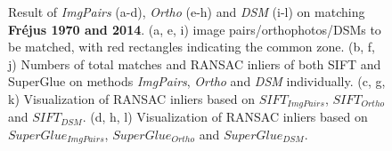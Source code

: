 \begin{figure}[htbp]
\begin{center}
{\begin{minipage}[t]{0.48\linewidth}
            \end{minipage}%
        }
        \caption{{\scriptsize Result of \textit{ImgPairs} (a-d), \textit{Ortho} (e-h) and \textit{DSM} (i-l) on matching \textbf{Fr{\'e}jus 1970 and 2014}. (a, e, i) image pairs/orthophotos/DSMs to be matched, with red rectangles indicating the common zone. (b, f, j) Numbers of total matches and RANSAC inliers of both SIFT and SuperGlue on methods \textit{ImgPairs}, \textit{Ortho} and \textit{DSM} individually. (c, g, k) Visualization of RANSAC inliers based on $SIFT_{ImgPairs}$, $SIFT_{Ortho}$ and $SIFT_{DSM}$. (d, h, l) Visualization of RANSAC inliers based on $SuperGlue_{ImgPairs}$, $SuperGlue_{Ortho}$ and $SuperGlue_{DSM}$.}}
        \label{MatchVizFrejus1970DSM}
    \end{center}
\end{figure} 


